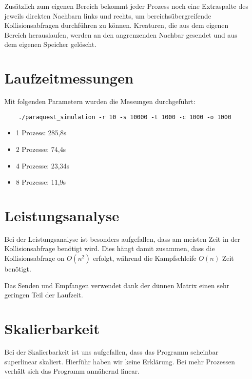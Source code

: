 \documentclass[a4paper,12pt]{article}
\begin{document}
Zusätzlich zum eigenen Bereich bekommt jeder Prozess noch
eine Extraspalte des jeweils direkten Nachbarn links und rechts, um
bereichsübergreifende Kollisionsabfragen durchführen zu können. Kreaturen, die
aus dem eigenen Bereich herauslaufen, werden an den angrenzenden Nachbar
gesendet und aus dem eigenen Speicher gelöscht.

\section{Laufzeitmessungen}
Mit folgenden Parametern wurden die Messungen durchgeführt:
\begin{verbatim}
	./paraquest_simulation -r 10 -s 10000 -t 1000 -c 1000 -o 1000
\end{verbatim}
\begin{itemize}
	\item 1 Prozess:  285,8s
	\item 2 Prozesse: 74,4s
	\item 4 Prozesse: 23,34s
	\item 8 Prozesse: 11,9s
\end{itemize}

\section{Leistungsanalyse}
Bei der Leistungsanalyse ist besonders aufgefallen, dass am meisten Zeit
in der Kollisionsabfrage benötigt wird. Dies hängt damit zusammen, dass die
Kollisionsabfrage on \(O(n^2)\) erfolgt, während die Kampfschleife \(O(n)\)
Zeit benötigt.

Das Senden und Empfangen verwendet dank der dünnen Matrix einen sehr geringen
Teil der Laufzeit.

\section{Skalierbarkeit}
Bei der Skalierbarkeit ist uns aufgefallen, dass das Programm scheinbar
superlinear skaliert. Hierführ haben wir keine Erklärung. Bei mehr Prozessen
verhält sich das Programm annähernd linear.
\end{document}
